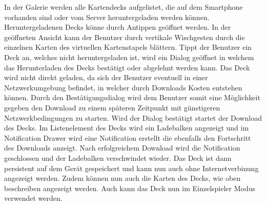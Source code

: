 \documentclass{scrartcl}
\begin{document}
\noindent
In der Galerie werden alle Kartendecks aufgelistet, die auf dem Smartphone
vorhanden sind oder vom Server heruntergeladen werden können. Heruntergeladenen
Decks könne durch Antippen geöffnet werden. In der geöffneten Ansicht kann der
Benutzer durch vertikale Wischgesten durch die einzelnen Karten des virtuellen
Kartenstapels blättern. Tippt der Benutzer ein Deck an, welches nicht
heruntergeladen ist, wird ein Dialog geöffnet in welchem das Herunterladen des
Decks bestätigt oder abgelehnt werden kann. Das Deck wird nicht direkt geladen,
da sich der Benutzer eventuell in einer Netzwerkumgebung befindet, in welcher
durch Downloads Kosten entstehen können. Durch den Bestätigungsdialog wird dem
Benutzer somit eine Möglichkeit gegeben den Download zu einem späteren Zeitpunkt
mit günstigeren Netzwerkbedingungen zu starten. Wird der Dialog bestätigt startet
der Download des Decks. Im Listenelement des Decks wird ein Ladebalken angezeigt
und im Notification Drawer wird eine Notification erstellt die ebenfalls den
Fortschritt des Downloads anzeigt. Nach erfolgreichem Download wird die
Notification geschlossen und der Ladebalken verschwindet wieder. Das Deck ist
dann persistent auf dem Gerät gespeichert und kann nun auch ohne
Internetverbinung angezeigt werden. Zudem können nun auch die Karten des Decks,
wie oben beschreiben angezeigt werden. Auch kann das Deck nun im Einzelspieler
Modus verwendet werden.
\end{document}
